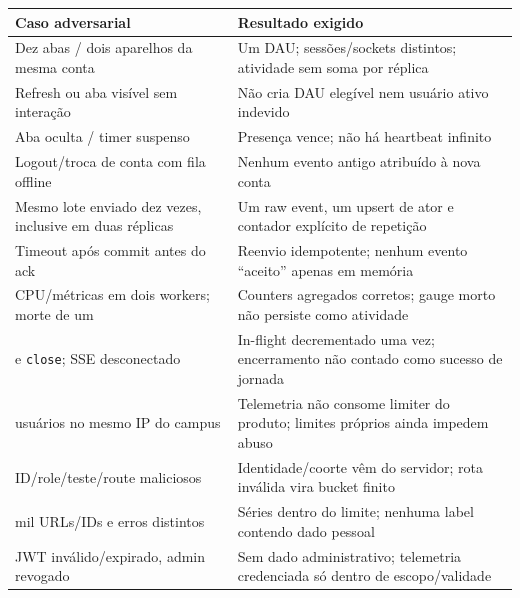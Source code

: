 \documentclass[10pt,a4paper]{article}
\renewcommand{\arraystretch}{1.2}
\begin{document}
{\def\LTcaptype{none} %
\fontsize{8.5}{10}\selectfont
\renewcommand{\arraystretch}{1.0}
\begin{longtable}[]{@{}
  >{\raggedright\arraybackslash}p{}
  >{\raggedright\arraybackslash}p{}@{}}
\toprule\noalign{}
\rowcolor{NFAccent}
\begin{minipage}[b]{\linewidth}\raggedright
Caso adversarial
\end{minipage} & \begin{minipage}[b]{\linewidth}\raggedright
Resultado exigido
\end{minipage} \\
\midrule\noalign{}
\endhead
\bottomrule\noalign{}
\endlastfoot
Dez abas / dois aparelhos da mesma conta & Um DAU; sessões/sockets
distintos; atividade sem soma por réplica \\
Refresh ou aba visível sem interação & Não cria DAU elegível nem usuário
ativo indevido \\
Aba oculta / timer suspenso & Presença vence; não há heartbeat
infinito \\
Logout/troca de conta com fila offline & Nenhum evento antigo atribuído
à nova conta \\
Mesmo lote enviado dez vezes, inclusive em duas réplicas & Um raw event,
um upsert de ator e contador explícito de repetição \\
Timeout após commit antes do ack & Reenvio idempotente; nenhum evento
``aceito'' apenas em memória \\
CPU/métricas em dois workers; morte de um & Counters agregados corretos;
gauge morto não persiste como atividade \\
{\footnotesize\ttfamily\nolinkurl{finish}} e {\footnotesize\ttfamily\nolinkurl{close}}; SSE desconectado & In-flight
decrementado uma vez; encerramento não contado como sucesso de
jornada \\
200 usuários no mesmo IP do campus & Telemetria não consome limiter do
produto; limites próprios ainda impedem abuso \\
ID/role/teste/route maliciosos & Identidade/coorte vêm do servidor; rota
inválida vira bucket finito \\
10 mil URLs/IDs e erros distintos & Séries dentro do limite; nenhuma
label contendo dado pessoal \\
JWT inválido/expirado, admin revogado & Sem dado administrativo;
telemetria credenciada só dentro de escopo/validade \\

\end{longtable}}
\end{document}
